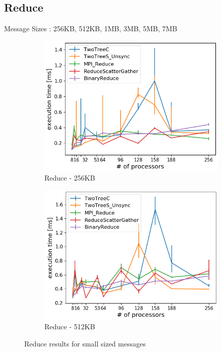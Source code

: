 \documentclass[sigplan,review,anonymous]{acmart}\settopmatter{printfolios=true,printccs=false,printacmref=false}
\begin{document}
\subsection{Reduce}

Message Sizes : 256KB, 512KB, 1MB, 3MB, 5MB, 7MB

\begin{figure}
\centering
\begin{subfigure}{.25\textwidth}
  \centering
  \includegraphics[width=1\linewidth]{images/Results/reducefinal_262144B.png}
  \caption{Reduce - 256KB}
  \label{reduce-selected-256B}
\end{subfigure}%
\begin{subfigure}{.25\textwidth}
  \centering
  \includegraphics[width=1\linewidth]{images/Results/reducefinal_524288B.png}
  \caption{Reduce - 512KB}
  \label{reduce-selected-512B}
\end{subfigure}
\caption{Reduce results for small sized messages}
\label{graph-reduce-small-selected}
\end{figure}
\end{document}
